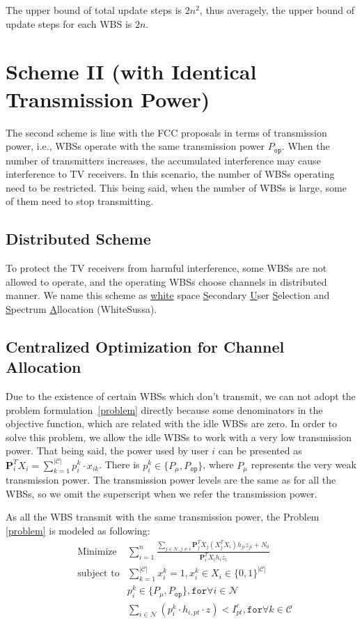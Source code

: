 \documentclass[times]{ettauth}
\newcommand{\ie}{i.e., }
\theoremstyle{mytheoremstyle}
\theoremstyle{mytheoremstyle}
\theoremstyle{mytheoremstyle}
\renewcommand{\vec}[1]{\mathbf{#1}}
\begin{document}
The upper bound of total update steps is $2n^2$, thus averagely, the upper bound of update steps for each WBS is $2n$.

\section{Scheme II (with Identical Transmission Power)}
The second scheme is line with the FCC proposals in terms of transmission power, \ie WBSs operate with the same transmission power $P_{\mathtt{op}}$.
When the number of transmitters increases, the accumulated interference may cause interference to TV receivers.
In this scenario, the number of WBSs operating need to be restricted.
This being said, when the number of WBSs is large, some of them need to stop transmitting.
\subsection{Distributed Scheme}
To protect the TV receivers from harmful interference, some WBSs are not allowed to operate, and the operating WBSs choose channels in distributed manner.
We name this scheme as \underline{white} space \underline{S}econdary \underline{U}ser \underline{S}election and \underline{S}pectrum \underline{A}llocation (WhiteSussa). 

\subsection{Centralized Optimization for Channel Allocation}
Due to the existence of certain WBSs which don't transmit, we can not adopt the problem formulation~\ref{problem} directly because some denominators in the objective function, which are related with the idle WBSs are zero.
In order to solve this problem, we allow the idle WBSs to work with a very low transmission power.
That being said, the power used by user $i$ can be presented as $\vec{P}_i^T X_i = \sum\limits_{k=1}^{|\mathcal{C}|}p_i^k\cdot x_{ik}$.
There is $p_i^k\in \{P_\mu, P_{\mathtt{op}}\}$, where $P_\mu$ represents the very weak transmission power.
The transmission power levels are the same as for all the WBSs, so we omit the superscript when we refer the transmission power.

As all the WBS transmit with the same transmission power, the Problem \ref{problem} is modeled as following:
	\begin{equation}
\label{QLP}
		\begin{aligned}
		& \underset{}{\text{Minimize}}
		&  \sum\limits^{n}_{i=1} \frac{\sum\limits_{j\in\mathcal{N}, j\neq i}\vec{P}_j^TX_j(X_j^TX_i)h_{ji}z_{ji} + N_0}{\vec{P}_i^TX_ih_iz_i}\\
		& \text{subject to}
		&  \sum\limits_{k=1}^{|\mathcal{C}|}x_i^k=1, x_i^k\in X_i\in \{0,1\}^{|\mathcal{C}|}\\
		& & p_i^k\in \{P_\mu, P_{\mathtt{op}}\}, \mathtt{for} \forall i\in \mathcal{N}\\
     	& & \sum_{i\in \mathcal{N}} (p^k_i \cdot h_{i,pt}\cdot z) < I^c_{pt},  \mathtt{for} \forall k\in \mathcal{C} 
		\end{aligned}
	\end{equation}
	
\end{document}
